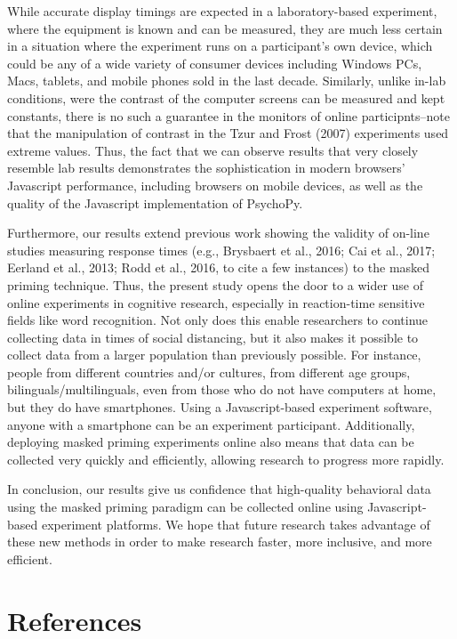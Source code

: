 \documentclass[
  english,
  man,floatsintext]{apa6}
\begin{document}
While accurate display timings are expected in a laboratory-based experiment, where the equipment is known and can be measured, they are much less certain in a situation where the experiment runs on a participant's own device, which could be any of a wide variety of consumer devices including Windows PCs, Macs, tablets, and mobile phones sold in the last decade. Similarly, unlike in-lab conditions, were the contrast of the computer screens can be measured and kept constants, there is no such a guarantee in the monitors of online participnts--note that the manipulation of contrast in the Tzur and Frost (2007) experiments used extreme values. Thus, the fact that we can observe results that very closely resemble lab results demonstrates the sophistication in modern browsers' Javascript performance, including browsers on mobile devices, as well as the quality of the Javascript implementation of PsychoPy.

Furthermore, our results extend previous work showing the validity of on-line studies measuring response times (e.g., Brysbaert et al., 2016; Cai et al., 2017; Eerland et al., 2013; Rodd et al., 2016, to cite a few instances) to the masked priming technique. Thus, the present study opens the door to a wider use of online experiments in cognitive research, especially in reaction-time sensitive fields like word recognition. Not only does this enable researchers to continue collecting data in times of social distancing, but it also makes it possible to collect data from a larger population than previously possible. For instance, people from different countries and/or cultures, from different age groups, bilinguals/multilinguals, even from those who do not have computers at home, but they do have smartphones. Using a Javascript-based experiment software, anyone with a smartphone can be an experiment participant. Additionally, deploying masked priming experiments online also means that data can be collected very quickly and efficiently, allowing research to progress more rapidly.

In conclusion, our results give us confidence that high-quality behavioral data using the masked priming paradigm can be collected online using Javascript-based experiment platforms. We hope that future research takes advantage of these new methods in order to make research faster, more inclusive, and more efficient.

\newpage

\hypertarget{references}{%
\section{References}\label{references}}
\end{document}

